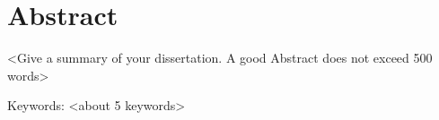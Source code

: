 \chapter*{Abstract}

<Give a summary of your dissertation. A good Abstract does not exceed 500 words>













Keywords: <about 5 keywords>
